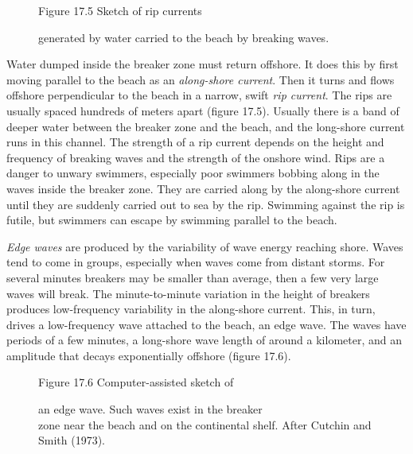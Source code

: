\begin{figure}[b!]
\vspace{-2ex}
\centering
\footnotesize
Figure 17.5 Sketch of rip currents \rule{0mm}{4ex}generated by water carried to the beach by breaking waves.

\label{fig:rips}
\end{figure}

Water dumped inside the breaker zone must return offshore. It does this by first moving parallel to the beach as an \textit{along-shore current}. Then it turns and flows offshore perpendicular to the beach in a narrow, swift \textit{rip current}. The rips are usually spaced hundreds of meters apart (figure 17.5). Usually there is a band of deeper water between the breaker zone and the beach, and the long-shore current runs in this channel. The strength of a rip current depends on the height and frequency of breaking waves and the strength of the onshore wind. Rips are a danger to unwary swimmers, especially poor swimmers bobbing along in the waves inside the breaker zone. They are carried along by the along-shore current until they are suddenly carried out to sea by the rip. Swimming against the rip is futile, but swimmers can escape by swimming parallel to the beach.

\textit{Edge waves} are produced by the variability of wave energy reaching shore. Waves tend to come in groups, especially when waves come from distant storms. For several minutes breakers may be smaller than average, then a few very large waves will break. The minute-to-minute variation in the height of breakers produces low-frequency variability in the along-shore current. This, in turn, drives a low-frequency wave attached to the beach, an edge wave. The waves have periods of a few minutes, a long-shore wave length of around a kilometer, and an amplitude that decays exponentially offshore (figure 17.6).

\begin{figure}[h!]
\vspace{-2ex}
\centering
\footnotesize
Figure 17.6 Computer-assisted sketch of \rule{0mm}{4ex}an edge wave. Such waves
exist in the breaker\\zone near the beach and on the continental shelf. After
Cutchin and Smith (1973).

\label{fig:edgewave}
\vspace{-4ex}
\end{figure}

